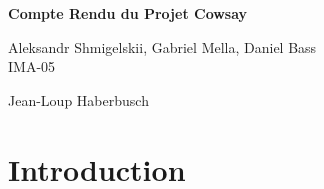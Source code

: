 \documentclass[a4paper,french,11pt]{article}
\begin{document}
\thispagestyle{empty}
\begin{center}

\vspace{10ex}
\huge\sffamily\textbf{Compte Rendu du Projet Cowsay}

\vspace{3ex}
\large


\vspace{3ex}
Aleksandr Shmigelskii, Gabriel Mella, Daniel Bass \\ IMA-05
\end{center}
\vspace{2ex}
{\sffamily \large}

\vspace{.5ex}
 Jean-Loup Haberbusch

\vspace{.5ex}
\tableofcontents  
\vspace{2ex}

\newpage
\section{Introduction}
\end{document}
